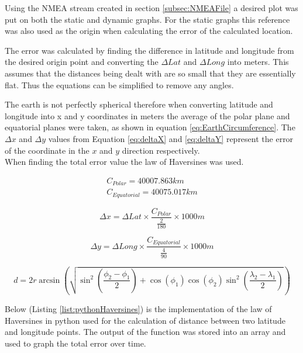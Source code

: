 Using the NMEA stream created in section \ref{subsec:NMEAFile} a desired plot was put on both the static and dynamic graphs. For the static graphs this reference was also
used as the origin when calculating the error of the calculated location.

The error was calculated by finding the difference in latitude and longitude from the desired origin point and converting the $\Delta Lat$ and $\Delta Long$ into meters.
This assumes that the distances being dealt with are so small that they are essentially flat. Thus the equations can be simplified to remove any angles.

The earth is not perfectly spherical therefore when converting latitude and longitude into x and y coordinates in meters the average of the polar plane and equatorial
planes were taken, as shown in equation \ref{eq:EarthCircumference}. The $\Delta x$ and $\Delta y$ values from Equation \ref{eq:deltaX} and \ref{eq:deltaY} represent
the error of the coordinate in the $x$ and $y$ direction respectively. \\
When finding the total error value the law of Haversines was used. 

\begin{equation} 
    \begin{split} \label{eq:EarthCircumference}
        C_{Polar} = 40007.863 km \\ 
        C_{Equatorial} = 40075.017 km
    \end{split}
\end{equation}

\begin{equation} \label{eq:deltaX}
    \Delta x = \Delta Lat \times \frac{C_{Polar}}{\frac{2}{180}} \times 1000 m
\end{equation}

\begin{equation} \label{eq:deltaY}
    \Delta y = \Delta Long \times \frac{C_{Equatorial}}{\frac{4}{90}} \times 1000 m
\end{equation}

\begin{equation} \label{eq:Haversine}
    d = 2r \arcsin\left(\sqrt{\sin^2\left(\frac{\phi_2 - \phi_1}{2}\right) + \cos\left(\phi_1\right)\cos\left(\phi_2\right)\sin^2\left(\frac{\lambda_2 - \lambda_1}{2}\right)}\right)
\end{equation}
 
Below (Listing \ref{list:pythonHaversines}) is the implementation of the law of Haversines in python used for the calculation of distance between two latitude and longitude points. The output of the function was stored
into an array and used to graph the total error over time.

